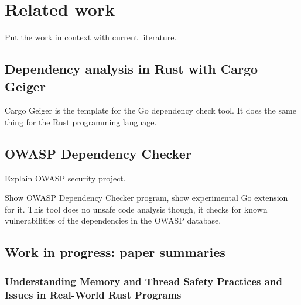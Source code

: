 
\chapter{Related work}\label{ch:related-work}

Put the work in context with current literature.



\section{Dependency analysis in Rust with Cargo Geiger}\label{sec:cargo-geiger}

Cargo Geiger is the template for the Go dependency check tool.
It does the same thing for the Rust programming language.



\section{OWASP Dependency Checker}\label{sec:owasp-dependency-checker}

Explain OWASP security project.

Show OWASP Dependency Checker program, show experimental Go extension for it.
This tool does no unsafe code analysis though, it checks for known vulnerabilities of the dependencies in the
OWASP database.



\section{Work in progress: paper summaries}\label{sec:paper-summaries}



\subsection{Understanding Memory and Thread Safety Practices and Issues in Real-World Rust Programs}
\label{subsec:understanding-memory-and-thread-safety-practices-and-issues-in-real-world-rust-programs}

